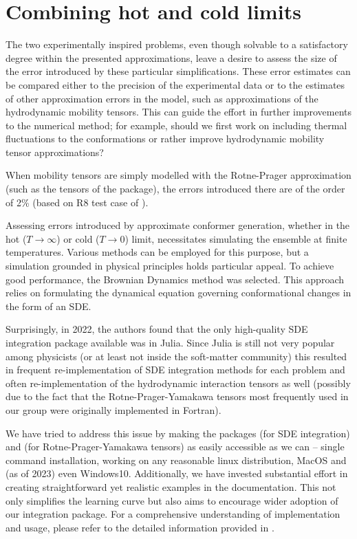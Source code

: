 \documentclass{doctoral}
\newcommand{\code}[1]{\texttt{\detokenize{#1}}}
\begin{document}
\section{Combining hot and cold limits}

\label{sec:combining_hot_and_cold_approaches}
The two experimentally inspired problems, even though solvable to a satisfactory degree within the presented approximations, leave a desire to assess the size of the error introduced by these particular simplifications.
These error estimates can be compared either to the precision of the experimental data or to the estimates of other approximation errors in the model, such as approximations of the hydrodynamic mobility tensors.
This can guide the effort in further improvements to the numerical method; for example, should we first work on including thermal fluctuations to the conformations or rather improve hydrodynamic mobility tensor approximations?

When mobility tensors are simply modelled with the Rotne-Prager approximation (such as the tensors of the \code{pygrpy} package), the errors introduced there are of the order of 2\% (based on R8 test case of \cite{Zuk_2018}).

Assessing errors introduced by approximate conformer generation, whether in the hot ($T\to\infty$) or cold ($T\to0$) limit, necessitates simulating the ensemble at finite temperatures.
Various methods can be employed for this purpose, but a simulation grounded in physical principles holds particular appeal.
To achieve good performance, the Brownian Dynamics method was selected.
This approach relies on formulating the dynamical equation governing conformational changes in the form of an SDE.

Surprisingly, in 2022, the authors found that the only high-quality SDE integration package available was \code{differentialequations.jl} in Julia\cite{Rackauckas_2017}.
Since Julia is still not very popular among physicists (or at least not inside the soft-matter community) this resulted in frequent re-implementation of SDE integration methods for each problem and often re-implementation of the hydrodynamic interaction tensors as well (possibly due to the fact that the Rotne-Prager-Yamakawa tensors most frequently used in our group were originally implemented in Fortran\cite{Zuk_2018}).

We have tried to address this issue by making the packages \code{pychastic} (for SDE integration) and \code{pygrpy} (for Rotne-Prager-Yamakawa tensors) as easily accessible as we can -- single command installation, working on any reasonable linux distribution, MacOS and (as of 2023) even Windows10\cite{jax_on_windows}.
Additionally, we have invested substantial effort in creating straightforward yet realistic examples in the documentation.
This not only simplifies the learning curve but also aims to encourage wider adoption of our integration package.
For a comprehensive understanding of implementation and usage, please refer to the detailed information provided in \textcite{Waszkiewicz_2023_pychastic}.
\end{document}
